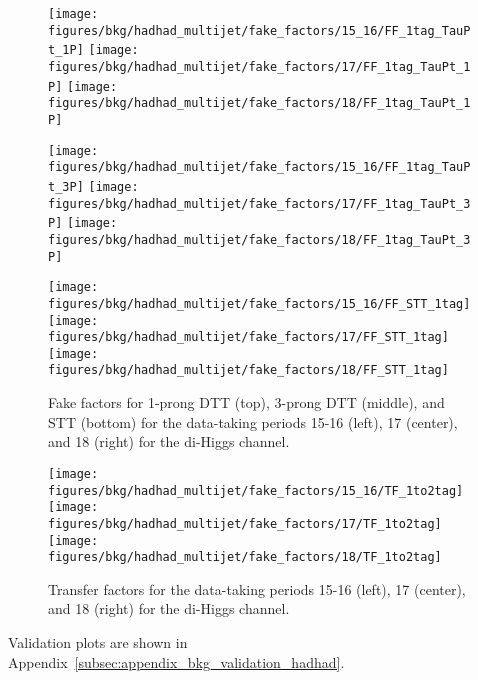 \begin{figure}[h]
  \centering

  \texttt{[image: figures/bkg/hadhad\_multijet/fake\_factors/15\_16/FF\_1tag\_TauPt\_1P]}
  \texttt{[image: figures/bkg/hadhad\_multijet/fake\_factors/17/FF\_1tag\_TauPt\_1P]}
  \texttt{[image: figures/bkg/hadhad\_multijet/fake\_factors/18/FF\_1tag\_TauPt\_1P]}

  \texttt{[image: figures/bkg/hadhad\_multijet/fake\_factors/15\_16/FF\_1tag\_TauPt\_3P]}
  \texttt{[image: figures/bkg/hadhad\_multijet/fake\_factors/17/FF\_1tag\_TauPt\_3P]}
  \texttt{[image: figures/bkg/hadhad\_multijet/fake\_factors/18/FF\_1tag\_TauPt\_3P]}

  \texttt{[image: figures/bkg/hadhad\_multijet/fake\_factors/15\_16/FF\_STT\_1tag]}
  \texttt{[image: figures/bkg/hadhad\_multijet/fake\_factors/17/FF\_STT\_1tag]}
  \texttt{[image: figures/bkg/hadhad\_multijet/fake\_factors/18/FF\_STT\_1tag]}

  \caption{Fake factors for 1-prong DTT (top), 3-prong DTT (middle), and STT
    (bottom) for the data-taking periods 15-16 (left), 17 (center), and 18
    (right) for the di-Higgs \hadhad channel.}

  \label{fig:hadhad_fake_factors}
\end{figure}

\begin{figure}[h]
  \centering

  \texttt{[image: figures/bkg/hadhad\_multijet/fake\_factors/15\_16/TF\_1to2tag]}
  \texttt{[image: figures/bkg/hadhad\_multijet/fake\_factors/17/TF\_1to2tag]}
  \texttt{[image: figures/bkg/hadhad\_multijet/fake\_factors/18/TF\_1to2tag]}

  \caption{Transfer factors for the data-taking periods 15-16 (left), 17
    (center), and 18 (right) for the di-Higgs \hadhad channel.}

  \label{fig:hadhad_transfer_factors}
\end{figure}

Validation plots are shown in Appendix~\ref{subsec:appendix_bkg_validation_hadhad}.


